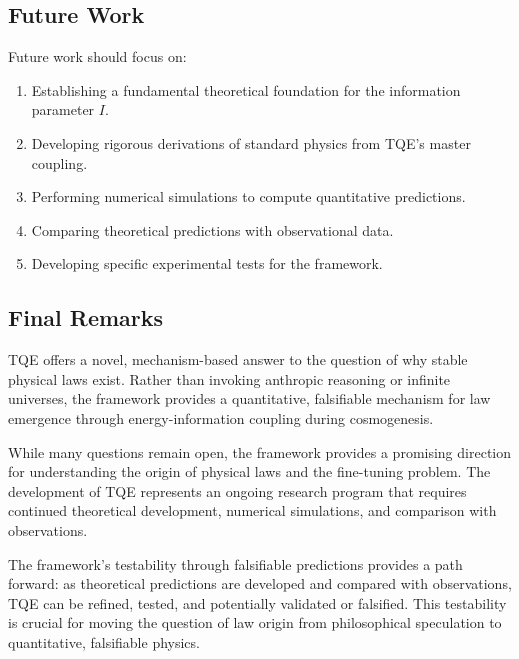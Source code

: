 \documentclass[12pt,a4paper]{article}
\theoremstyle{definition}
\theoremstyle{remark}
\begin{document}
\subsection{Future Work}

Future work should focus on:

\begin{enumerate}
\item Establishing a fundamental theoretical foundation for the information parameter $I$.

\item Developing rigorous derivations of standard physics from TQE's master coupling.

\item Performing numerical simulations to compute quantitative predictions.

\item Comparing theoretical predictions with observational data.

\item Developing specific experimental tests for the framework.
\end{enumerate}

\subsection{Final Remarks}

TQE offers a novel, mechanism-based answer to the question of why stable physical laws exist. Rather than invoking anthropic reasoning or infinite universes, the framework provides a quantitative, falsifiable mechanism for law emergence through energy-information coupling during cosmogenesis.

While many questions remain open, the framework provides a promising direction for understanding the origin of physical laws and the fine-tuning problem. The development of TQE represents an ongoing research program that requires continued theoretical development, numerical simulations, and comparison with observations.

The framework's testability through falsifiable predictions provides a path forward: as theoretical predictions are developed and compared with observations, TQE can be refined, tested, and potentially validated or falsified. This testability is crucial for moving the question of law origin from philosophical speculation to quantitative, falsifiable physics.
\end{document}
